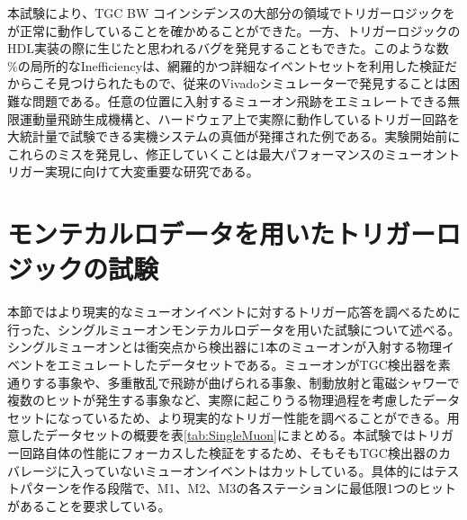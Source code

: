 本試験により、TGC BW コインシデンスの大部分の領域でトリガーロジックをが正常に動作していることを確かめることができた。一方、トリガーロジックのHDL実装の際に生じたと思われるバグを発見することもできた。このような数 \%の局所的なInefficiencyは、網羅的かつ詳細なイベントセットを利用した検証だからこそ見つけられたもので、従来のVivadoシミュレーターで発見することは困難な問題である。任意の位置に入射するミューオン飛跡をエミュレートできる無限運動量飛跡生成機構と、ハードウェア上で実際に動作しているトリガー回路を大統計量で試験できる実機システムの真価が発揮された例である。実験開始前にこれらのミスを発見し、修正していくことは最大パフォーマンスのミューオントリガー実現に向けて大変重要な研究である。


\section{モンテカルロデータを用いたトリガーロジックの試験}
\label{sec_SingleMuon}

本節ではより現実的なミューオンイベントに対するトリガー応答を調べるために行った、シングルミューオンモンテカルロデータを用いた試験について述べる。シングルミューオンとは衝突点から検出器に1本のミューオンが入射する物理イベントをエミュレートしたデータセットである。ミューオンがTGC検出器を素通りする事象や、多重散乱で飛跡が曲げられる事象、制動放射と電磁シャワーで複数のヒットが発生する事象など、実際に起こりうる物理過程を考慮したデータセットになっているため、より現実的なトリガー性能を調べることができる。用意したデータセットの概要を表\ref{tab:SingleMuon}にまとめる。本試験ではトリガー回路自体の性能にフォーカスした検証をするため、そもそもTGC検出器のカバレージに入っていないミューオンイベントはカットしている。具体的にはテストパターンを作る段階で、M1、M2、M3の各ステーションに最低限1つのヒットがあることを要求している。

